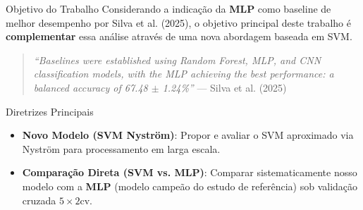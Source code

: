 \documentclass{beamer}
\begin{document}
\begin{frame}{Objetivo do Trabalho}
    \small
    Considerando a indicação da \textbf{MLP} como baseline de melhor desempenho por Silva et al. (2025), o objetivo principal deste trabalho é \textbf{complementar} essa análise através de uma nova abordagem baseada em SVM.
    
    \begin{quote}
        \scriptsize
        \textit{``Baselines were established using Random Forest, MLP, and CNN classification models, with the MLP achieving the best performance: a balanced accuracy of 67.48 $\pm$ 1.24\%''}
        \newline\hfill --- Silva et al. (2025)
    \end{quote}
    
    \vspace{-0.1cm}
    \begin{block}{\footnotesize Diretrizes Principais}
        \scriptsize
        \begin{itemize}
            \item \textbf{Novo Modelo (SVM Nyström)}: Propor e avaliar o SVM aproximado via Nyström para processamento em larga escala.
            \item \textbf{Comparação Direta (SVM vs. MLP)}: Comparar sistematicamente nosso modelo com a \textbf{MLP} (modelo campeão do estudo de referência) sob validação cruzada $5\times2$cv.
        \end{itemize}
    \end{block}
\end{frame}
\end{document}
